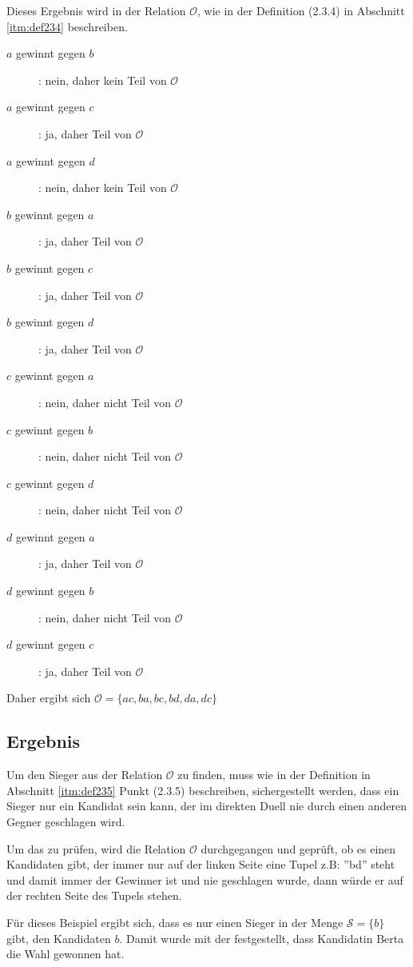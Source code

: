 Dieses Ergebnis wird in der Relation $\mathcal{O}$, wie in der Definition (2.3.4) in Abschnitt \ref{itm:def234} beschreiben.
\newpage
\begin{description}
\item[$a$ gewinnt gegen $b$]: nein, daher kein Teil von $\mathcal{O}$ 
\item[$a$ gewinnt gegen $c$]: ja, daher Teil von $\mathcal{O}$ 
\item[$a$ gewinnt gegen $d$]: nein, daher kein Teil von $\mathcal{O}$ 
\item[$b$ gewinnt gegen $a$]: ja, daher Teil von $\mathcal{O}$ 
\item[$b$ gewinnt gegen $c$]: ja, daher Teil von $\mathcal{O}$ 
\item[$b$ gewinnt gegen $d$]: ja, daher Teil von $\mathcal{O}$ 
\item[$c$ gewinnt gegen $a$]: nein, daher nicht Teil von $\mathcal{O}$ 
\item[$c$ gewinnt gegen $b$]: nein, daher nicht Teil von $\mathcal{O}$ 
\item[$c$ gewinnt gegen $d$]: nein, daher nicht Teil von $\mathcal{O}$ 
\item[$d$ gewinnt gegen $a$]: ja, daher Teil von $\mathcal{O}$ 
\item[$d$ gewinnt gegen $b$]: nein, daher nicht Teil von $\mathcal{O}$ 
\item[$d$ gewinnt gegen $c$]: ja, daher Teil von $\mathcal{O}$ 
\end{description} 

Daher ergibt sich $\mathcal{O} = \{ ac,ba,bc,bd,da,dc \}$

\subsection{Ergebnis} 
\label{sec:ergebnis1}
Um den Sieger aus der Relation $\mathcal{O}$ zu finden, muss wie in der Definition in Abschnitt \ref{itm:def235} Punkt (2.3.5) beschreiben, sichergestellt werden, dass ein Sieger nur ein Kandidat sein kann, der im direkten Duell nie durch einen anderen Gegner geschlagen wird.

Um das zu prüfen, wird die Relation $\mathcal{O}$ durchgegangen und geprüft, ob es einen Kandidaten gibt, der immer nur auf der linken Seite eine Tupel z.B: ''bd'' steht und damit immer der Gewinner ist und nie geschlagen wurde, dann würde er auf der rechten Seite des Tupels stehen.

Für dieses Beispiel ergibt sich, dass es nur einen Sieger in der Menge $\mathcal{S}=\{b\}$ gibt, den Kandidaten $b$. Damit wurde mit der \schulze festgestellt, dass Kandidatin Berta die Wahl gewonnen hat.

